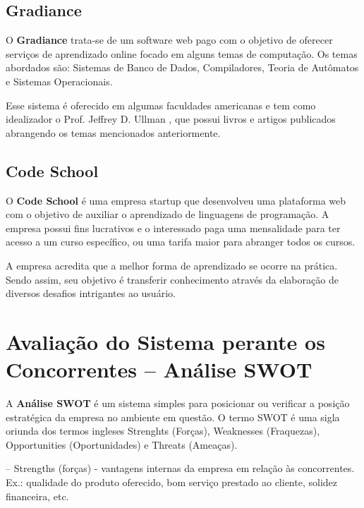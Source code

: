 \documentclass[graduacao,brazil]{ThesisPUC}
\begin{document}
\subsection{Gradiance}

O \textbf{Gradiance} trata-se de um software web pago com o objetivo de oferecer servi\c{c}os de aprendizado
online focado em alguns temas de computa\c{c}\~{a}o. Os temas abordados s\~{a}o: Sistemas de Banco de Dados,
Compiladores, Teoria de Aut\^{o}matos e Sistemas Operacionais.

Esse sistema \'{e} oferecido em algumas faculdades americanas e tem como idealizador o Prof. Jeffrey D. Ullman
\cite{Ullman}, que possui livros e artigos publicados abrangendo os temas mencionados anteriormente.

\subsection{Code School}

O \textbf{Code School} \'{e} uma empresa startup que desenvolveu uma plataforma web com o objetivo de auxiliar
o aprendizado de linguagens de programa\c{c}\~{a}o. A empresa possui fins lucrativos e o interessado paga
uma mensalidade para ter acesso a um curso espec\'{i}fico, ou uma tarifa maior para abranger todos os cursos.

A empresa acredita que a melhor forma de aprendizado se ocorre na pr\'{a}tica. Sendo assim, seu objetivo \'{e}
transferir conhecimento atrav\'{e}s da elabora\c{c}\~{a}o de diversos desafios intrigantes ao usu\'{a}rio.


\section{Avalia\c{c}\~{a}o do Sistema perante os Concorrentes -- An\'{a}lise SWOT}

A \textbf{An\'{a}lise SWOT} \cite{Fine09} \'{e} um sistema simples para posicionar ou verificar a
posi\c{c}\~{a}o estrat\'{e}gica da empresa no ambiente em quest\~{a}o. O termo SWOT \'{e} uma sigla
oriunda dos termos ingleses Strenghts (Forças), Weaknesses (Fraquezas), Opportunities (Oportunidades)
e Threats (Ameaças).

-- Strengths (forças) - vantagens internas da empresa em relação às concorrentes. Ex.:
qualidade do produto oferecido, bom serviço prestado ao cliente, solidez financeira, etc.
\end{document}
